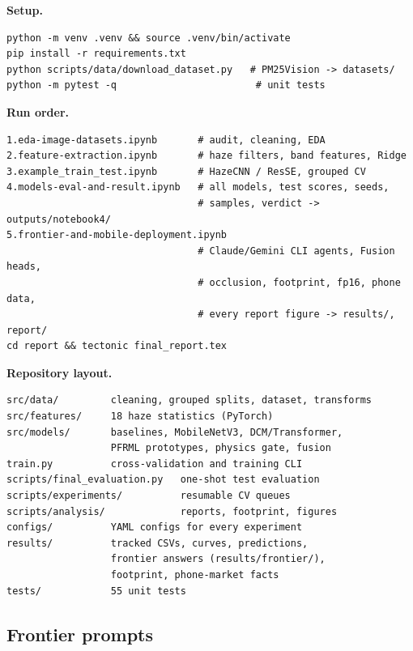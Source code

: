 \documentclass[conference]{IEEEtran}
\begin{document}
\textbf{Setup.}
\begin{lstlisting}
python -m venv .venv && source .venv/bin/activate
pip install -r requirements.txt
python scripts/data/download_dataset.py   # PM25Vision -> datasets/
python -m pytest -q                        # unit tests
\end{lstlisting}

\textbf{Run order.}
\begin{lstlisting}
1.eda-image-datasets.ipynb       # audit, cleaning, EDA
2.feature-extraction.ipynb       # haze filters, band features, Ridge
3.example_train_test.ipynb       # HazeCNN / ResSE, grouped CV
4.models-eval-and-result.ipynb   # all models, test scores, seeds,
                                 # samples, verdict -> outputs/notebook4/
5.frontier-and-mobile-deployment.ipynb
                                 # Claude/Gemini CLI agents, Fusion heads,
                                 # occlusion, footprint, fp16, phone data,
                                 # every report figure -> results/, report/
cd report && tectonic final_report.tex
\end{lstlisting}

\textbf{Repository layout.}
\begin{lstlisting}
src/data/         cleaning, grouped splits, dataset, transforms
src/features/     18 haze statistics (PyTorch)
src/models/       baselines, MobileNetV3, DCM/Transformer,
                  PFRML prototypes, physics gate, fusion
train.py          cross-validation and training CLI
scripts/final_evaluation.py   one-shot test evaluation
scripts/experiments/          resumable CV queues
scripts/analysis/             reports, footprint, figures
configs/          YAML configs for every experiment
results/          tracked CSVs, curves, predictions,
                  frontier answers (results/frontier/),
                  footprint, phone-market facts
tests/            55 unit tests
\end{lstlisting}

\subsection{Frontier prompts}
\end{document}
